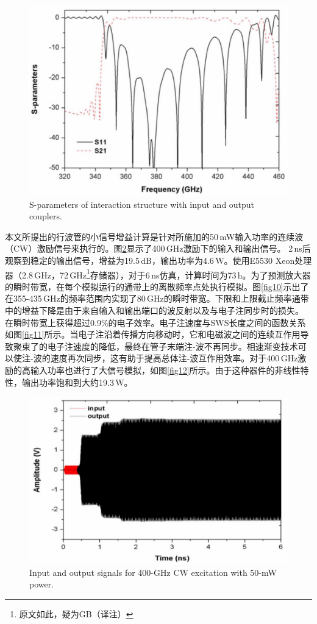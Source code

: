 \documentclass[10pt,a4paper,UTF8]{ctexart}
\begin{document}
\begin{figure}[phtb]
	\centering
	\includegraphics[width=0.95\linewidth]{figure/fig8}
	\caption{S-parameters of interaction structure with input and output couplers.}
	\label{fig8}
\end{figure}


本文所提出的行波管的小信号增益计算是针对所施加的50\,mW输入功率的连续波（CW）激励信号来执行的。图\ref{fig9}显示了400\,GHz激励下的输入和输出信号。 2\,ns后观察\newpage \noindent 到稳定的输出信号，增益为19.5\,dB，输出功率为4.6\,W。使用E5530 Xeon处理器（2.8\,GHz，72\,GHz\footnote{原文如此，疑为GB（译注）}存储器），对于6\,ns仿真，计算时间为73\,h。为了预测放大器的瞬时带宽，在每个模拟运行的通带上的离散频率点处执行模拟。图\ref{fig10}示出了在355-435\,GHz的频率范围内实现了80\,GHz的瞬时带宽。下限和上限截止频率通带中的增益下降是由于来自输入和输出端口的波反射以及与电子注同步时的损失。 在瞬时带宽上获得超过0.9\%的电子效率。电子注速度与SWS长度之间的函数关系如图\ref{fig11}所示。当电子注沿着传播方向移动时，它和电磁波之间的连续互作用导致聚束了的电子注速度的降低，最终在管子末端注-波不再同步。相速渐变技术可以使注-波的速度再次同步，这有助于提高总体注-波互作用效率。对于400\,GHz激励的高输入功率也进行了大信号模拟，如图\ref{fig12}所示。由于这种器件的非线性特性，输出功率饱和到大约19.3\,W。

\begin{figure}[phtb]
	\centering
	\includegraphics[width=0.95\linewidth]{figure/fig9}
	\caption{Input and output signals for 400-GHz CW excitation with 50-mW
power.}
	\label{fig9}
\end{figure}
\end{document}
